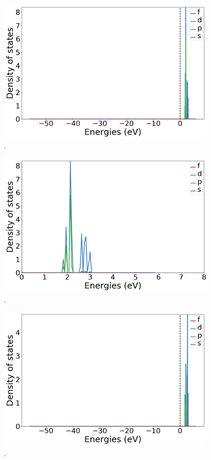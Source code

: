 \documentclass{article}
\begin{document}
  \begin{figure}[H]
      \centering
      \includegraphics[width = 11cm]{../fig/Yb_k4_LDOS25_1.png}
      \caption{. }
      \label{fig:Yb_k4_LDOS25_1.png}
  \end{figure}

  \begin{figure}[H]
      \centering
      \includegraphics[width = 11cm]{../fig/Yb_k4_LDOS25_2.png}
      \caption{. }
      \label{fig:Yb_k4_LDOS25_2.png}
  \end{figure}

  \begin{figure}[H]
      \centering
      \includegraphics[width = 11cm]{../fig/Yb_k4_LDOS26_1.png}
      \caption{. }
      \label{fig:Yb_k4_LDOS26_1.png}
  \end{figure}
\end{document}
